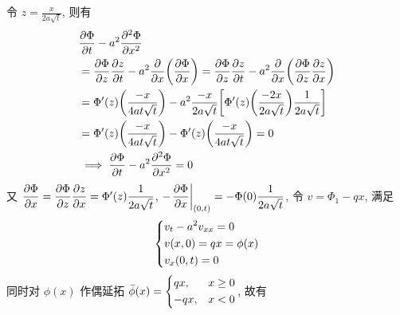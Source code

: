 \begin{solution}
令 $z = \frac{x}{2a\sqrt{t}}$, 则有
\begin{align*}
&{\frac{\partial {\Phi}}{\partial {t}}} - a^2 {\frac{\partial {^2\Phi}}{\partial {x^2}}} \\
&= {\frac{\partial {\Phi}}{\partial {z}}} {\frac{\partial {z}}{\partial {t}}}
 - a^2 {{\frac{\partial {}}{\partial {x}}}}{\left( {{\frac{\partial {\Phi}}{\partial {x}}}} \right)}
= {\frac{\partial {\Phi}}{\partial {z}}} {\frac{\partial {z}}{\partial {t}}}
 - a^2 {{\frac{\partial {}}{\partial {x}}}}{\left( {{\frac{\partial {\Phi}}{\partial {z}}}{\frac{\partial {z}}{\partial {x}}}} \right)} \\
&= \Phi'(z) {\left( {\frac{-x}{4at\sqrt{t}}} \right)}
 - a^2 \frac{-x}{2a\sqrt{t}} {\left[ {
  \Phi'(z) {\left( {\frac{-2x}{2a\sqrt{t}}} \right)} \frac1{2a\sqrt{t}}
 } \right]} \\
&= \Phi'(z) {\left( {\frac{-x}{4at\sqrt{t}}} \right)}
 - \Phi'(z) {\left( {\frac{-x}{4at\sqrt{t}}} \right)} = 0\\
&\implies {\frac{\partial {\Phi}}{\partial {t}}} - a^2 {\frac{\partial {^2\Phi}}{\partial {x^2}}} = 0
\end{align*}
又 ${\dfrac{\partial {\Phi}}{\partial {x}}} = {\dfrac{\partial {\Phi}}{\partial {z}}}{\dfrac{\partial {z}}{\partial {x}}}
= \Phi'(z)\dfrac{1}{2a\sqrt{t}}$,
$-{\left.{{\dfrac{\partial {\Phi}}{\partial {x}}}} \right|}_{(0, t)}=-\Phi(0)\dfrac{1}{2a\sqrt{t}}$,
令 $v = \Phi_1 - qx$, 满足
\[ \begin{dcases}
v_t - a^2 v_{xx} = 0 \\
v(x, 0) = qx = \phi(x) \\
v_x(0, t) = 0
\end{dcases} \]
同时对 $\phi(x)$ 作偶延拓
$\bar{\phi}(x) = \begin{dcases}qx,&x\geq0\\-qx,&x<0\end{dcases}$, 故有


\end{solution}
